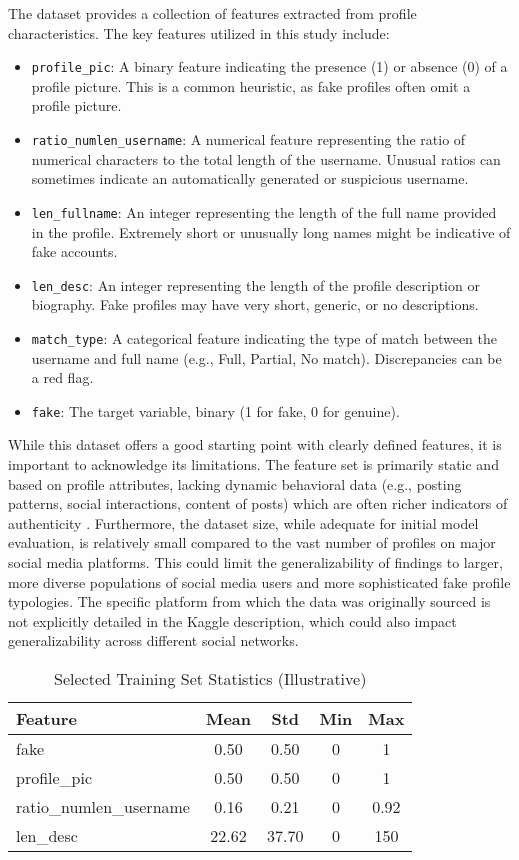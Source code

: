 \documentclass[conference]{IEEEtran}
\begin{document}
The dataset provides a collection of features extracted from profile characteristics. The key features utilized in this study include:
\begin{itemize}
    \item \texttt{profile\_pic}: A binary feature indicating the presence (1) or absence (0) of a profile picture. This is a common heuristic, as fake profiles often omit a profile picture.
    \item \texttt{ratio\_numlen\_username}: A numerical feature representing the ratio of numerical characters to the total length of the username. Unusual ratios can sometimes indicate an automatically generated or suspicious username.
    \item \texttt{len\_fullname}: An integer representing the length of the full name provided in the profile. Extremely short or unusually long names might be indicative of fake accounts.
    \item \texttt{len\_desc}: An integer representing the length of the profile description or biography. Fake profiles may have very short, generic, or no descriptions.
    \item \texttt{match\_type}: A categorical feature indicating the type of match between the username and full name (e.g., Full, Partial, No match). Discrepancies can be a red flag.
    \item \texttt{fake}: The target variable, binary (1 for fake, 0 for genuine).
\end{itemize}
While this dataset offers a good starting point with clearly defined features, it is important to acknowledge its limitations. The feature set is primarily static and based on profile attributes, lacking dynamic behavioral data (e.g., posting patterns, social interactions, content of posts) which are often richer indicators of authenticity \cite{b12}. Furthermore, the dataset size, while adequate for initial model evaluation, is relatively small compared to the vast number of profiles on major social media platforms. This could limit the generalizability of findings to larger, more diverse populations of social media users and more sophisticated fake profile typologies. The specific platform from which the data was originally sourced is not explicitly detailed in the Kaggle description, which could also impact generalizability across different social networks.

\begin{table}[htbp]
\caption{Selected Training Set Statistics (Illustrative)}
\begin{center}
\begin{tabular}{|l|c|c|c|c|}
\hline
\textbf{Feature} & \textbf{Mean} & \textbf{Std} & \textbf{Min} & \textbf{Max} \\
\hline
fake & 0.50 & 0.50 & 0 & 1 \\
profile\_pic & 0.50 & 0.50 & 0 & 1 \\
ratio\_numlen\_username & 0.16 & 0.21 & 0 & 0.92 \\
len\_desc & 22.62 & 37.70 & 0 & 150 \\
\hline
\end{tabular}
\label{tab:stats}
\end{center}
\end{table}
\end{document}
